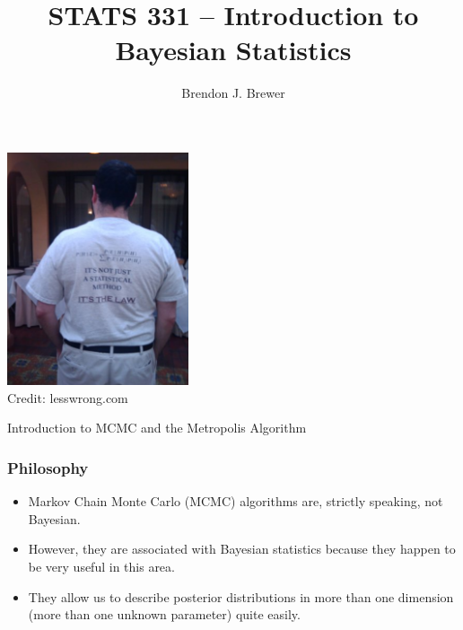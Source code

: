 \documentclass{beamer}
\author{Brendon J. Brewer}
\title{STATS 331 -- Introduction to Bayesian Statistics}
\institute{The University of Auckland}
\date{}
\begin{document}
\frame{\titlepage}

\begin{frame}
\begin{center}
\includegraphics[width=0.4\textwidth]{images/tshirt.png} \\
Credit: lesswrong.com
\end{center}

\end{frame}

\begin{frame}
\begin{center}
\Large
Introduction to MCMC and the Metropolis Algorithm
\end{center}

\end{frame}

\begin{frame}
\frametitle{Philosophy}
\begin{itemize}
\item Markov Chain Monte Carlo (MCMC) algorithms are, strictly speaking, not
Bayesian.\pause
\item However, they are associated with Bayesian statistics because they happen
to be very useful in this area.\pause
\item They allow us to describe posterior distributions in more than one
dimension (more than one unknown parameter) quite easily.
\end{itemize}
\end{frame}
\end{document}
